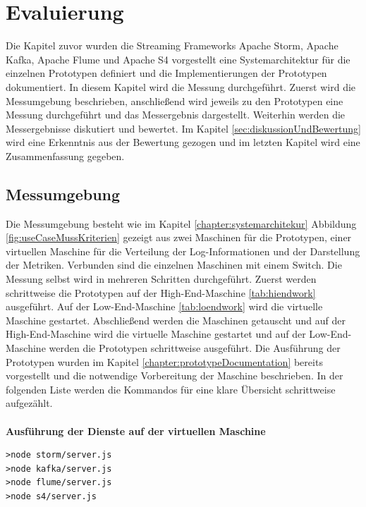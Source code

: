\chapter{Evaluierung}
\label{chapter:evaluierung}

Die Kapitel zuvor wurden die Streaming Frameworks Apache Storm, Apache Kafka, Apache Flume und Apache S4 vorgestellt eine Systemarchitektur für die einzelnen Prototypen definiert und die Implementierungen der Prototypen dokumentiert. In diesem Kapitel wird die Messung durchgeführt. Zuerst wird die Messumgebung beschrieben, anschließend wird jeweils zu den Prototypen eine Messung durchgeführt und das Messergebnis dargestellt. Weiterhin werden die Messergebnisse diskutiert und bewertet. Im Kapitel \ref{sec:diskussionUndBewertung} wird eine Erkenntnis aus der Bewertung gezogen und im letzten Kapitel wird eine Zusammenfassung gegeben.

\section{Messumgebung}
\label{sec:aufbauMessumgebung}

Die Messumgebung besteht wie im Kapitel \ref{chapter:systemarchitekur} Abbildung \ref{fig:useCaseMussKriterien} gezeigt aus zwei Maschinen für die Prototypen, einer virtuellen Maschine für die Verteilung der Log-Informationen und der Darstellung der Metriken. Verbunden sind die einzelnen Maschinen mit einem Switch. Die Messung selbst wird in mehreren Schritten durchgeführt. Zuerst werden schrittweise die Prototypen auf der High-End-Maschine \ref{tab:hiendwork} ausgeführt. Auf der Low-End-Maschine \ref{tab:loendwork} wird die virtuelle Maschine gestartet. Abschließend werden die Maschinen getauscht und auf der High-End-Maschine wird die virtuelle Maschine gestartet und auf der Low-End-Maschine werden die Prototypen schrittweise ausgeführt. Die Ausführung der Prototypen wurden im Kapitel \ref{chapter:prototypeDocumentation} bereits vorgestellt und die notwendige Vorbereitung der Maschine beschrieben. In der folgenden Liste werden die Kommandos für eine klare Übersicht schrittweise aufgezählt. \\\\

\textbf{Ausführung der Dienste auf der virtuellen Maschine}

\begin{verbatim}
>node storm/server.js
>node kafka/server.js
>node flume/server.js
>node s4/server.js
\end{verbatim}



